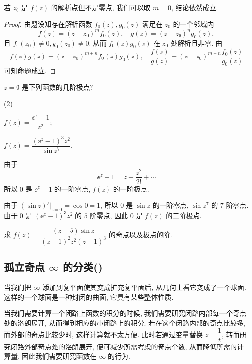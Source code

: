 若 $z_0$ 是 $f(z)$ 的解析点但不是零点, 我们可以取 $m=0$, 结论依然成立.

\begin{proof}
  由题设知存在解析函数 $f_0(z),g_0(z)$ 满足在 $z_0$ 的一个邻域内
  \[
    f(z)=(z-z_0)^mf_0(z),\quad 
    g(z)=(z-z_0)^ng_0(z),
  \]
  且 $f_0(z_0)\neq0,g_0(z_0)\neq 0$.
  从而 $f_0(z)g_0(z)$ 在 $z_0$ 处解析且非零.
  由
  \[
    f(z)g(z)=(z-z_0)^{m+n}f_0(z)g_0(z),\quad
    \frac{f(z)}{g(z)}=(z-z_0)^{m-n}\frac{f_0(z)}{g_0(z)}
  \]
  可知命题成立.
\end{proof}

\begin{example}
  $z=0$ 是下列函数的几阶极点?
  \begin{subexample}(2)
    \item $f(z)=\dfrac{\ee^z-1}{z^2}$;
    \item $f(z)=\dfrac{(\ee^z-1)^3z^2}{\sin z^7}$.
  \end{subexample}
\end{example}

\begin{solutionenum}
  \item 由于
  \[
    \ee^z-1=z+\frac{z^2}{2!}+\cdots
  \]
  所以 $0$ 是 $\ee^z-1$ 的一阶零点, $f(z)$ 的一阶极点.
  \item 由于 $(\sin z)'|_{z=0}=\cos 0=1$, 所以 $0$ 是 $\sin z$ 的一阶零点, $\sin z^7$ 的 $7$ 阶零点.
  由于 $0$ 是 $(\ee^z-1)^3z^2$ 的 $5$ 阶零点, 因此 $0$ 是 $f(z)$ 的二阶极点.
\end{solutionenum}

\begin{exercise}
  求 $f(z)=\dfrac{(z-5)\sin z}{(z-1)^2z^2(z+1)^3}$ 的奇点以及极点的阶.
\end{exercise}


\subsection{孤立奇点 \texorpdfstring{$\infty$}{∞} 的分类(\optional)}

当我们把 $\infty$ 添加到复平面使其变成扩充复平面后, 从几何上看它变成了一个球面.
这样的一个球面是一种封闭的曲面, 它具有某些整体性质.

当我们需要计算一个闭路上函数的积分的时候,
我们需要研究闭路内部每一个奇点处的洛朗展开,
从而得到相应的小闭路上的积分.
若在这个闭路内部的奇点比较多, 而外部的奇点比较少时, 这样计算就不太方便.
此时若通过变量替换 $z=\dfrac1t$, 转而研究闭路外部奇点处的洛朗展开, 便可减少所需考虑的奇点个数, 从而降低所需的计算量.
因此我们需要研究函数在 $\infty$ 的行为.

